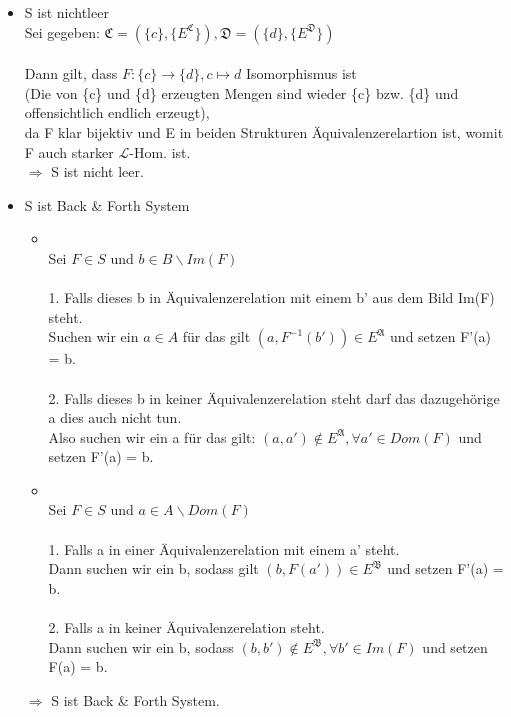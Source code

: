 \documentclass[a4paper]{scrartcl}
\begin{document}
    \begin{itemize}
        \item S ist nichtleer\\
            Sei gegeben: $\mathfrak{C} = (\{c\}, \{E^\mathfrak{C}\}), \mathfrak{D} = (\{d\}, \{E^\mathfrak{D}\})$\\
            \\Dann gilt, dass $F: \{c\} \rightarrow \{d\}, c \mapsto d$ Isomorphismus ist
            \\(Die von \{c\} und \{d\} erzeugten Mengen sind wieder \{c\} bzw. \{d\} und offensichtlich endlich erzeugt),\\
            da F klar bijektiv und E in beiden Strukturen Äquivalenzerelartion ist, womit F auch starker $\mathscr{L}$-Hom. ist.\\
            $\Rightarrow$ S ist nicht leer.\\

        \item S ist Back \& Forth System\\
            \begin{itemize}
                \item {}\\
                    Sei $F \in S$ und $b \in B\backslash Im(F)$\\                  
                    \\1. Falls dieses b in Äquivalenzerelation mit einem b' aus dem Bild Im(F) steht.\\
                    Suchen wir ein $a \in A$ für das gilt $(a, F^{-1}(b')) \in E^{\mathfrak{A}}$ und setzen F'(a) = b.\\
                    \\2. Falls dieses b in keiner Äquivalenzerelation steht darf das dazugehörige a dies auch nicht tun.\\
                    Also suchen wir ein a für das gilt: $(a, a') \notin E^{\mathfrak{A}}, \forall a' \in Dom(F)$ und setzen F'(a) = b.\\

                \item {}\\
                    Sei $F \in S$ und $a \in A\backslash Dom(F)$\\
                    \\1. Falls a in einer Äquivalenzerelation mit einem a' steht.\\
                    Dann suchen wir ein b, sodass gilt $(b, F(a')) \in E^{\mathfrak{B}}$ und setzen F'(a) = b.\\
                    \\2. Falls a in keiner Äquivalenzerelation steht.\\
                    Dann suchen wir ein b, sodass $(b, b') \notin E^{\mathfrak{B}}, \forall b' \in Im(F)$ und setzen F(a) = b.\\
            \end{itemize}

            $\Rightarrow$ S ist Back \& Forth System.\\
    \end{itemize}
\end{document}
